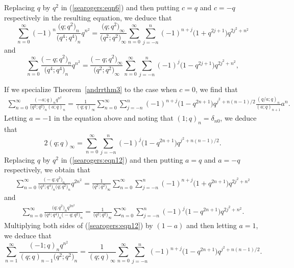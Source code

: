\documentclass[pdftex]{sigma}
\numberwithin{equation}{section}
\begin{document}
Replacing $q$ by $q^2$ in (\ref{searogers:eqn6}) and then putting $c=q$ and $c=-q$ respectively in the resulting equation, we deduce that
\begin{equation*}%
\sum_{n=0}^\infty (-1)^n \frac{\bigl(q; q^2\bigr)_n }{\bigl(q^4; q^4\bigr)_n} q^{n^2}
=\frac{\bigl(q; q^2\bigr)_\infty}{\bigl(q^2; q^2\bigr)_\infty}
\sum_{n=0}^\infty \sum_{j=-n}^n (-1)^{n+j} \bigl(1+q^{2j+1}\bigr) q^{2j^2+n^2}
\end{equation*}
and
\begin{equation*}%
	\sum_{n=0}^\infty \frac{\bigl(-q; q^2\bigr)_n }{\bigl(q^4; q^4\bigr)_n} q^{n^2}
	=\frac{\bigl(-q; q^2\bigr)_\infty}{\bigl(q^2; q^2\bigr)_\infty}
	\sum_{n=0}^\infty \sum_{j=-n}^n (-1)^{j} \bigl(1-q^{2j+1}\bigr) q^{2j^2+n^2},
\end{equation*}

If we specialize Theorem~\ref{andrrthm3} to the case when $c=0$, we find that
\begin{align}\label{searogers:eqn12}
\sum_{n=0}^\infty \frac{(-a; q)_n q^{n^2}}{\bigl(q^2; q^2\bigr)_n (a; q)_n}
=\frac{1}{(q; q)_\infty} \sum_{n=0}^\infty \sum_{j=-n}^n (-1)^{n+j}\bigl(1-q^{2n+1}\bigr) q^{j^2+n(n-1)/2}
\frac{(q/a; q)_n }{(a; q)_{n+1}}a^n. 	
\end{align}
Letting $a=-1$ in the equation above and noting that $(1; q)_n=\delta_{n0}$, we deduce that
\begin{equation*}%
2(q; q)_\infty=\sum_{n=0}^\infty \sum_{j=-n}^n (-1)^{j}\bigl(1-q^{2n+1}\bigr) q^{j^2+n(n-1)/2}.	
\end{equation*}
Replacing $q$ by $q^2$ in (\ref{searogers:eqn12}) and then putting $a=q$ and $a=-q$ respectively, we obtain that
\begin{align*}%
\sum_{n=0}^\infty \frac{\bigl(-q; q^2\bigr)_n}{\bigl(q^4; q^4\bigr)_n \bigl(q; q^2\bigr)_n} q^{2n^2}
=\frac{1}{\bigl(q^2; q^2\bigr)_\infty}
\sum_{n=0}^\infty \sum_{j=-n}^n (-1)^{n+j}\bigl(1+q^{2n+1}\bigr) q^{2j^2+n^2}
\end{align*}
and
\begin{align*}%
	\sum_{n=0}^\infty \frac{\bigl(q; q^2\bigr)_n q^{2n^2}}{\bigl(q^4; q^4\bigr)_n \bigl(-q; q^2\bigr)_n}
	=\frac{1}{\bigl(q^2; q^2\bigr)_\infty}
	\sum_{n=0}^\infty \sum_{j=-n}^n (-1)^{j}\bigl(1-q^{2n+1}\bigr) q^{2j^2+n^2}.
\end{align*}
Multiplying both sides of (\ref{searogers:eqn12}) by $(1-a)$ and then letting $a=1$, we deduce that
\begin{equation*}%
\sum_{n=1}^\infty \frac{(-1; q)_n q^{n^2}}{(q; q)_{n-1} \bigl(q^2; q^2\bigr)_n}=\frac{1}{(q; q)_\infty} \sum_{n=0}^\infty \sum_{j=-n}^n (-1)^{n+j}\bigl(1-q^{2n+1}\bigr) q^{j^2+n(n-1)/2}.
\end{equation*}
\end{document}
